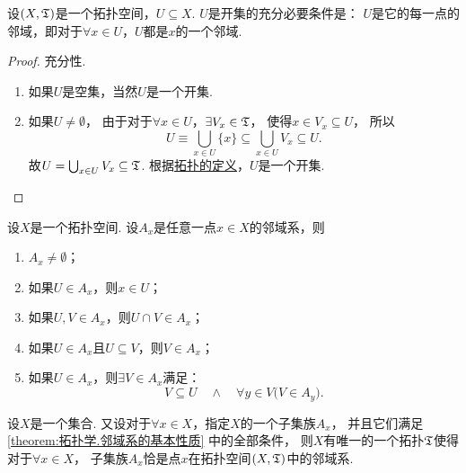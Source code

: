 \begin{theorem}\label{theorem:拓扑学.成为开集的充分必要条件1}
设\((X,\mathfrak T)\)是一个拓扑空间，\(U \subseteq X\).
\(U\)是开集的充分必要条件是：
\(U\)是它的每一点的邻域，即对于\(\forall x \in U\)，\(U\)都是\(x\)的一个邻域.
\begin{proof}
充分性.
\begin{enumerate}
	\item 如果\(U\)是空集，当然\(U\)是一个开集.

	\item 如果\(U\neq\emptyset\)，
	由于对于\(\forall x \in U\)，\(\exists V_x \in \mathfrak T\)，
	使得\(x \in V_x \subseteq U\)，
	所以\[
	U \equiv \bigcup_{x \in U} \{ x \}
	\subseteq \bigcup_{x \in U} V_x
	\subseteq U.
	\]
	故\(U = \bigcup_{x \in U} V_x \subseteq \mathfrak T\).
	根据\hyperref[definition:拓扑学.开集公理定义的拓扑空间]{拓扑的定义}，\(U\)是一个开集.
	\qedhere
\end{enumerate}
\end{proof}
\end{theorem}

\begin{theorem}\label{theorem:拓扑学.邻域系的基本性质}
设\(X\)是一个拓扑空间.
设\(A_x\)是任意一点\(x \in X\)的邻域系，则
\begin{enumerate}
	\item \(A_x \neq \emptyset\)；
	\item 如果\(U \in A_x\)，则\(x \in U\)；
	\item 如果\(U,V \in A_x\)，则\(U \cap V \in A_x\)；
	\item 如果\(U \in A_x\)且\(U \subseteq V\)，则\(V \in A_x\)；
	\item 如果\(U \in A_x\)，则\(\exists V \in A_x\)满足：\[
		V \subseteq U
		\quad\land\quad
		\forall y \in V \bigl( V \in A_y \bigr).
	\]
\end{enumerate}
\end{theorem}

\begin{theorem}\label{theorem:拓扑学.从邻域系出发定义拓扑}
设\(X\)是一个集合.
又设对于\(\forall x \in X\)，指定\(X\)的一个子集族\(A_x\)，
并且它们满足\cref{theorem:拓扑学.邻域系的基本性质} 中的全部条件，
则\(X\)有唯一的一个拓扑\(\mathfrak T\)使得对于\(\forall x \in X\)，
子集族\(A_x\)恰是点\(x\)在拓扑空间\((X,\mathfrak T)\)中的邻域系.
\end{theorem}

